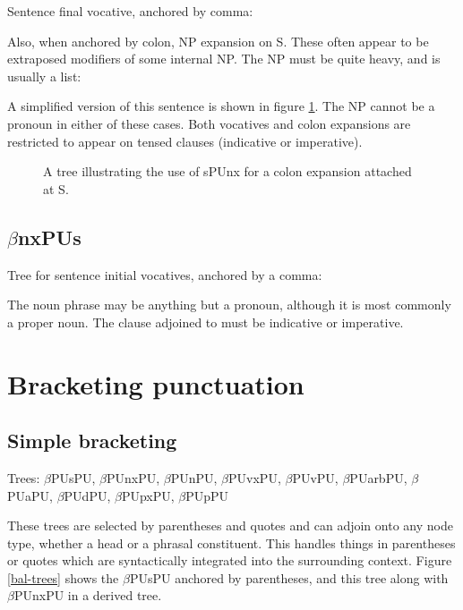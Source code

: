 Sentence final vocative, anchored by comma:  
 

Also, when anchored by colon, NP expansion on S. These often appear to
be extraposed modifiers of some internal NP. The NP must be quite
heavy, and is usually a list:


A simplified version of this sentence is shown in figure
\ref{sPUnx}. The NP cannot be a pronoun in either of these cases.
Both vocatives and colon expansions are restricted to appear on tensed
clauses (indicative or imperative).

\begin{figure}[hbt]
\centering
\hspace{0.0in}
\caption{A tree illustrating the use of sPUnx for a colon expansion
attached at S.}
\label{sPUnx}
\end{figure}


\subsection{$\beta$nxPUs}

Tree for sentence initial vocatives, anchored by a comma: 


The noun phrase may be anything but a pronoun, although it is most
commonly a proper noun. The clause adjoined to must be indicative or
imperative.

\section{Bracketing punctuation}
\label{bal}

\subsection{Simple bracketing}

Trees: $\beta$PUsPU, $\beta$PUnxPU, $\beta$PUnPU, $\beta$PUvxPU, $\beta$PUvPU,
$\beta$PUarbPU, $\beta$PUaPU, $\beta$PUdPU, $\beta$PUpxPU,
$\beta$PUpPU

\noindent
These trees are selected by parentheses and quotes and can adjoin onto
any node type, whether a head or a phrasal constituent.  This handles
things in parentheses or quotes which are syntactically integrated
into the surrounding context. Figure \ref{bal-trees} shows the $\beta$PUsPU
anchored by parentheses, and this tree along with $\beta$PUnxPU in a
derived tree.

